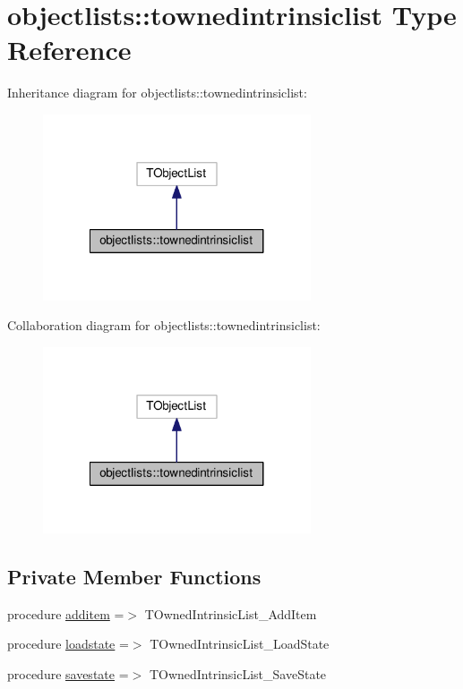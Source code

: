 \hypertarget{structobjectlists_1_1townedintrinsiclist}{}\section{objectlists\+:\+:townedintrinsiclist Type Reference}
\label{structobjectlists_1_1townedintrinsiclist}


Inheritance diagram for objectlists\+:\+:townedintrinsiclist\+:
\nopagebreak
\begin{figure}[H]
\begin{center}
\leavevmode
\includegraphics[width=224pt]{structobjectlists_1_1townedintrinsiclist__inherit__graph}
\end{center}
\end{figure}


Collaboration diagram for objectlists\+:\+:townedintrinsiclist\+:
\nopagebreak
\begin{figure}[H]
\begin{center}
\leavevmode
\includegraphics[width=224pt]{structobjectlists_1_1townedintrinsiclist__coll__graph}
\end{center}
\end{figure}
\subsection*{Private Member Functions}
\begin{DoxyCompactItemize}
\item 
procedure \mbox{\hyperlink{structobjectlists_1_1townedintrinsiclist_ac616ea95f35132baa09b76e043fb951c}{additem}} =$>$ T\+Owned\+Intrinsic\+List\+\_\+\+Add\+Item
\item 
procedure \mbox{\hyperlink{structobjectlists_1_1townedintrinsiclist_aae658f97d6726b929a394a0c8f4bc6bf}{loadstate}} =$>$ T\+Owned\+Intrinsic\+List\+\_\+\+Load\+State
\item 
procedure \mbox{\hyperlink{structobjectlists_1_1townedintrinsiclist_a9a82c57bfe6c687851c65c0a354e0be0}{savestate}} =$>$ T\+Owned\+Intrinsic\+List\+\_\+\+Save\+State
\end{DoxyCompactItemize}



